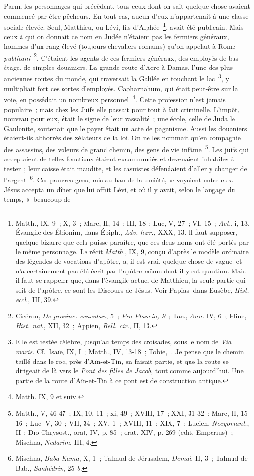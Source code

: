 \documentclass[french,twoside]{book} %
\begin{document}
Parmi les personnages qui précèdent, tous ceux dont on sait quelque chose avaient commencé par être pêcheurs. En tout cas, aucun d’eux n’appartenait à une classe sociale élevée. Seul, Matthieu, ou Lévi, fils d’Alphée \footnote{ Matth., IX, 9 ; X, 3 ; Marc, II, 14 ; III, 18 ; Luc, V, 27 ; VI, 15 ; {\itshape Act}., i, 13. Évangile des Ébionim, dans Épiph., {\itshape Adv. hær.}, XXX, 13. Il faut supposer, quelque bizarre que cela puisse paraître, que ces deus noms ont été portés par le même personnage. Le récit {\itshape Matth}., IX, 9, conçu d’après le modèle ordinaire des légendes de vocations d’apôtre, a, il est vrai, quelque chose de vague, et n’a certainement pas été écrit par l’apôtre même dont il y est question. Mais il faut se rappeler que, dans l’évangile actuel de Matthieu, la seule partie qui soit de l’apôtre, ce sont les Discours de Jésus. Voir Papias, dans Eusèbe, {\itshape Hist. eccl}., III, 39.}, avait été publicain. Mais ceux à qui on donnait ce nom en Judée n’étaient pas les fermiers généraux, hommes d’un rang élevé (toujours chevaliers romains) qu’on appelait à Rome {\itshape publicani} \footnote{ Cicéron, {\itshape De provinc. consular}., 5 ; {\itshape Pro Plancio, 9} ; Tac., {\itshape Ann.} IV, 6 ; Pline, {\itshape Hist. nat}., XII, 32 ; Appien, {\itshape Bell. civ}., II, 13.}. C’étaient les agents de ces fermiers généraux, des employés de bas étage, de simples douaniers. La grande route d’Acre à Damas, l’une des plus anciennes routes du monde, qui traversait la Galilée en touchant le lac \footnote{ Elle est restée célèbre, jusqu’au temps des croisades, sous le nom de {\itshape Via maris}. Cf. Isaïe, IX, I ; Matth., IV, 13-18 ; Tobie, \textsc{i}. Je pense que le chemin taillé dans le roc, près d’Aïn-et-Tin, en faisait partie, et que la route se dirigeait de là vers le {\itshape Pont des filles de Jacob}, tout comme aujourd’hui. Une partie de la route d’Aïn-et-Tin à ce pont est de construction antique.}, y multipliait fort ces sortes d’employés. Capharnahum, qui était peut-être sur la voie, en possédait un nombreux personnel \footnote{Matth. IX, 9 et suiv.}. Cette profession n’est jamais populaire ; mais chez les Juifs elle passait pour tout à fait criminelle. L’impôt, nouveau pour eux, était le signe de leur vassalité ; une école, celle de Juda le Gaulonite, soutenait que le payer était un acte de paganisme. Aussi les douaniers étaient-ils abhorrés des zélateurs de la loi. On ne les nommait qu’en compagnie des assassins, des voleurs de grand chemin, des gens de vie infâme \footnote{ Matth., V, 46-47 ; IX, 10, 11 ; xi, 49 ; XVIII, 17 ; XXI, 31-32 ; Marc, II, 15-16 ; Luc, V, 30 ; VII, 34 ; XV, 1 ; XVIII, 11 ; XIX, 7 ; Lucien, {\itshape Necyomant}., II ; Dio Chrysost., orat, IV, p. 85 ; orat. XIV, p. 269 (edit. Emperius) ; Mischna, {\itshape Nedarim}, III, 4.}. Les juifs qui acceptaient de telles fonctions étaient excommuniés et devenaient inhabiles à tester ; leur caisse était maudite, et les casuistes défendaient d’aller y changer de l’argent \footnote{ Mischna, {\itshape Baba Kama}, X, 1 ; Talmud de Jérusalem, {\itshape Demai}, II, 3 ; Talmud de Bab., {\itshape Sanhédrin}, 25 {\itshape b}.}. Ces pauvres gens, mis au ban de la société, se voyaient entre eux. Jésus accepta un dîner que lui offrit Lévi, et où il y avait, selon le langage du temps, « beaucoup de 
\end{document}
